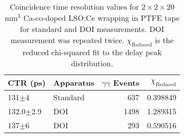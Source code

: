 \begin{table}
\caption{\label{tab:referencevals} Coincidence time resolution values for $2\times2\times20$mm$^3$ Ca-co-doped LSO:Ce wrapping in PTFE tape for standard and DOI measurements. DOI measurement was repeated twice. $\chi_\text{Reduced}$ is the reduced chi-squared fit to the delay peak distribution.}

\begin{tabular}{llrr}
\hline
       CTR (ps) &   Apparatus &  $\gamma\gamma$ Events &  $\chi_\text{Reduced}$ \\
\hline
     131$\pm$4 &  Standard &           637 &    0.398849 \\
 132.0$\pm$2.9 &   DOI &          1498 &    1.289315 \\
     137$\pm$6 &   DOI &           293 &    0.590516 \\
\hline
\end{tabular}
\end{table}